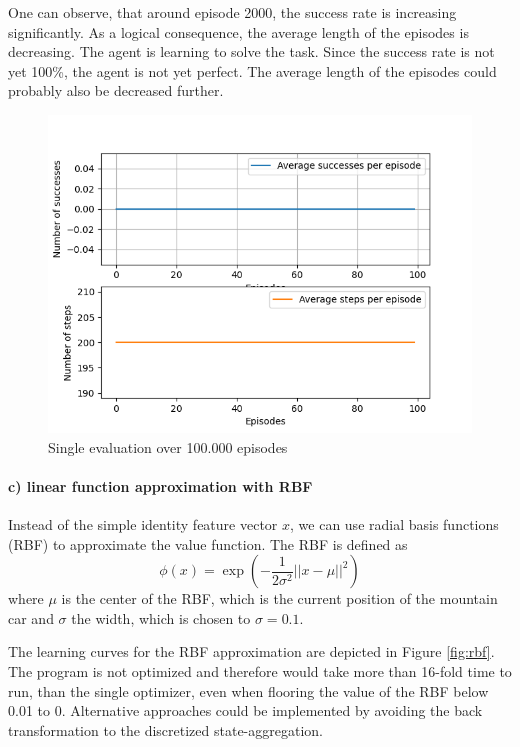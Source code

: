 \documentclass{article}
\begin{document}
One can observe, that around episode 2000, the success rate is increasing significantly. As a logical consequence, the average length of the episodes is decreasing. The agent is learning to solve the task. Since the success rate is not yet 100\%, the agent is not yet perfect. The average length of the episodes could probably also be decreased further.

\begin{figure}[H]
\centering
\includegraphics[width=0.8 \textwidth]{images/repeated_training_investigation_long.png}
\caption{Single evaluation over 100.000 episodes}
\label{fig:}
\end{figure}



\paragraph*{c) linear function approximation with RBF}

Instead of the simple identity feature vector $x$, we can use radial basis functions (RBF) to approximate the value function. The RBF is defined as
\begin{equation}
    \phi(x) = \exp\left(-\frac{1}{2\sigma^2}||x - \mu||^2\right)
\end{equation}
where $\mu$ is the center of the RBF, which is the current position of the mountain car and $\sigma$ the width, which is chosen to $\sigma=0.1$.

The learning curves for the RBF approximation are depicted in Figure \ref{fig:rbf}. The program is not optimized and therefore would take more than 16-fold time to run, than the single optimizer, even when flooring the value of the RBF below 0.01 to 0. Alternative approaches could be implemented by avoiding the back transformation to the discretized state-aggregation.
\end{document}
